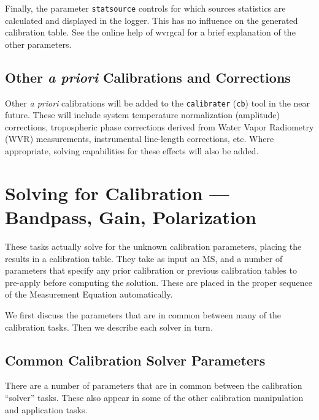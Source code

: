{Finally, the parameter {\tt statsource} controls for which sources statistics are calculated and
displayed in the logger. This has no influence on the generated calibration table.
See the online help of wvrgcal for a brief explanation of the other
parameters.


\subsection{Other {\it a priori} Calibrations and Corrections}
\label{section:cal.prior.other}

Other {\it a priori} calibrations will be added to the 
{\tt calibrater} ({\tt cb}) tool 
in the near future.  These will include
system temperature normalization (amplitude) corrections,
tropospheric phase corrections derived from Water Vapor Radiometry
(WVR) measurements, instrumental line-length corrections, etc.  Where
appropriate, solving capabilities for these effects will also be
added.

\section{Solving for Calibration --- Bandpass, Gain, Polarization}
\label{section:cal.solve}

These tasks actually solve for the unknown calibration parameters,
placing the results in a calibration table.  They take as input
an MS, and a number of parameters that specify any prior calibration
or previous calibration tables to pre-apply before computing the
solution.  These are placed in the proper sequence of the Measurement
Equation automatically.

We first discuss the parameters that are in common between many
of the calibration tasks.  Then we describe each solver in turn.

\subsection{Common Calibration Solver Parameters}
\label{section:cal.solve.pars}

There are a number of parameters that are in common between 
the calibration ``solver'' tasks.  These also appear in some
of the other calibration manipulation and application tasks.

}

